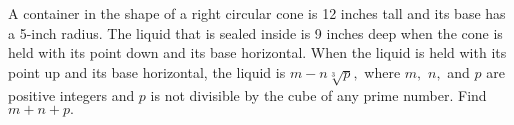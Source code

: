 A container in the shape of a right circular cone is 12 inches tall and its base has a 5-inch radius. The liquid that is sealed inside is 9 inches deep when the cone is held with its point down and its base horizontal. When the liquid is held with its point up and its base horizontal, the liquid is $m-n\sqrt[3]{p},$ where $m,$ $n,$ and $p$ are positive integers and $p$ is not divisible by the cube of any prime number. Find $m+n+p.$